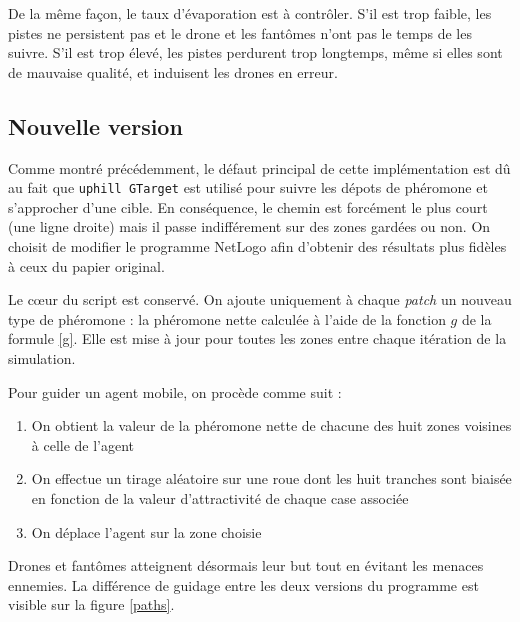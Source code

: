\documentclass[12pt]{article}
\begin{document}
De la même façon, le taux d'évaporation est à contrôler. S'il est trop
faible, les pistes ne persistent pas et le drone et les fantômes n'ont
pas le temps de les suivre. S'il est trop élevé, les pistes perdurent
trop longtemps, même si elles sont de mauvaise qualité, et induisent
les drones en erreur.

\subsection{Nouvelle version}

Comme montré précédemment, le défaut principal de cette implémentation
est dû au fait que \texttt{uphill GTarget} est utilisé pour suivre les
dépots de phéromone et s'approcher d'une cible. En conséquence, le
chemin est forcément le plus court (une ligne droite) mais il passe
indifférement sur des zones gardées ou non. On choisit de modifier le
programme NetLogo afin d'obtenir des résultats plus fidèles à ceux du
papier original.

Le c\oe ur du script est conservé. On ajoute uniquement à chaque
\textit{patch} un nouveau type de phéromone : la phéromone nette
calculée à l'aide de la fonction $g$ de la formule \ref{g}. Elle est
mise à jour pour toutes les zones entre chaque itération de la
simulation.

Pour guider un agent mobile, on procède comme suit :

\begin{enumerate}
  \item{On obtient la valeur de la phéromone nette de chacune des huit
    zones voisines à celle de l'agent}
  \item{On effectue un tirage aléatoire sur une roue dont les huit
    tranches sont biaisée en fonction de la valeur d'attractivité de
    chaque case associée}
  \item{On déplace l'agent sur la zone choisie}
\end{enumerate}

Drones et fantômes atteignent désormais leur but tout en évitant les
menaces ennemies. La différence de guidage entre les deux versions du
programme est visible sur la figure \ref{paths}.
\end{document}
